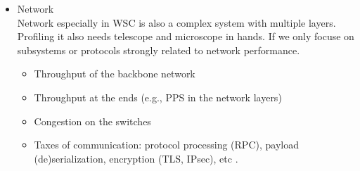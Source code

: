 \begin{itemize}
\begin{itemize}
  \item Network \\
    Network especially in WSC is also a complex system with multiple layers. Profiling it also needs telescope and microscope in hands. If we only focuse on subsystems or protocols strongly related to network performance.
    \begin{itemize}
      \item Throughput of the backbone network \autocite{DBLP:series/synthesis/2018Barroso}
      \item Throughput at the ends (e.g., PPS in the network layers) \autocite{DBLP:conf/conext/BarbetteKMK19, DBLP:conf/usenix/HedayatiSSM19}
      \item Congestion on the switches \autocite{DBLP:conf/sigcomm/AlizadehGMPPPSS10}
      \item Taxes of communication: protocol processing (RPC), payload (de)serialization, encryption (TLS, IPsec), etc \autocite{DBLP:journals/micro/KanevDHRMWB16}.


\end{itemize}
\end{itemize}
\end{itemize}

